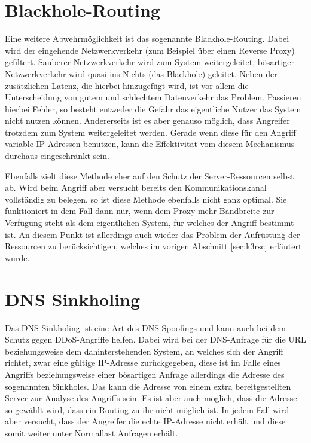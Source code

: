 \section{Blackhole-Routing}
Eine weitere Abwehrmöglichkeit ist das sogenannte Blackhole-Routing. Dabei wird der eingehende Netzwerkverkehr (zum Beispiel über einen Reverse Proxy) gefiltert. \glqq Sauberer\grqq{} Netzwerkverkehr wird zum System weitergeleitet, bösartiger Netzwerkverkehr wird quasi ins Nichts (das Blackhole) geleitet. Neben der zusätzlichen Latenz, die hierbei hinzugefügt wird, ist vor allem die Unterscheidung von gutem und schlechtem Datenverkehr das Problem. Passieren hierbei Fehler, so besteht entweder die Gefahr das eigentliche Nutzer das System nicht nutzen können. Andererseits ist es aber genauso möglich, dass Angreifer trotzdem zum System weitergeleitet werden. Gerade wenn diese für den Angriff variable IP-Adressen benutzen, kann die Effektivität vom diesem Mechanismus durchaus eingeschränkt sein. \cite{CloudflareBlackhole}

Ebenfalls zielt diese Methode eher auf den Schutz der Server-Ressourcen selbst ab. Wird beim Angriff aber versucht bereits den Kommunikationskanal vollständig zu belegen, so ist diese Methode ebenfalls nicht ganz optimal. Sie funktioniert in dem Fall dann nur, wenn dem Proxy mehr Bandbreite zur Verfügung steht als dem eigentlichen System, für welches der Angriff bestimmt ist. An diesem Punkt ist allerdings auch wieder das Problem der Aufrüstung der Ressourcen zu berücksichtigen, welches im vorigen Abschnitt \ref{sec:k3rsc} erläutert wurde.

\section{DNS Sinkholing}
Das DNS Sinkholing ist eine Art des DNS Spoofings und kann auch bei dem Schutz gegen DDoS-Angriffe helfen. Dabei wird bei der DNS-Anfrage für die URL beziehungsweise dem dahinterstehenden System, an welches sich der Angriff richtet, zwar eine gültige IP-Adresse zurückgegeben, diese ist im Falle eines Angriffs beziehungsweise einer bösartigen Anfrage allerdings die Adresse des sogenannten Sinkholes. Das kann die Adresse von einem extra bereitgestellten Server zur Analyse des Angriffs sein. Es ist aber auch möglich, dass die Adresse so gewählt wird, dass ein Routing zu ihr nicht möglich ist. In jedem Fall wird aber versucht, dass der Angreifer die echte IP-Adresse nicht erhält und diese somit weiter unter Normallast Anfragen erhält. \cite{Kaimal2019}

